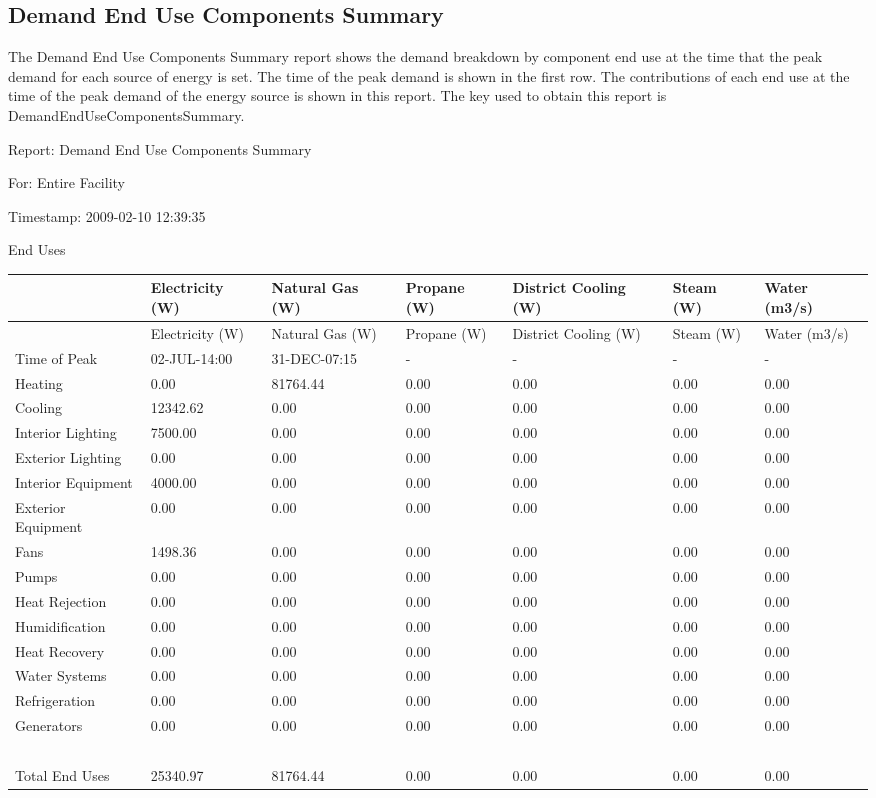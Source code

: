 \subsection{Demand End Use Components Summary}\label{demand-end-use-components-summary}

The Demand End Use Components Summary report shows the demand breakdown by component end use at the time that the peak demand for each source of energy is set. The time of the peak demand is shown in the first row. The contributions of each end use at the time of the peak demand of the energy source is shown in this report. The key used to obtain this report is DemandEndUseComponentsSummary.

Report: Demand End Use Components Summary

For: Entire Facility

Timestamp: 2009-02-10 12:39:35

End Uses

{\scriptsize
\begin{longtable}[c]{>{\raggedright}p{0.85in}>{\raggedright}p{0.85in}>{\raggedright}p{0.85in}>{\raggedright}p{0.85in}>{\raggedright}p{0.85in}>{\raggedright}p{0.85in}>{\raggedright}p{0.85in}}
\toprule
~ & Electricity (W) & Natural Gas (W) & Propane (W) & District Cooling (W) & Steam (W) & Water (m3/s) \tabularnewline
\midrule
\endfirsthead

\toprule
~ & Electricity (W) & Natural Gas (W) & Propane (W) & District Cooling (W) & Steam (W) & Water (m3/s) \tabularnewline
\midrule
\endhead

Time of Peak & 02-JUL-14:00 & 31-DEC-07:15 & - & - & - & - \tabularnewline
Heating & 0.00 & 81764.44 & 0.00 & 0.00 & 0.00 & 0.00 \tabularnewline
Cooling & 12342.62 & 0.00 & 0.00 & 0.00 & 0.00 & 0.00 \tabularnewline
Interior Lighting & 7500.00 & 0.00 & 0.00 & 0.00 & 0.00 & 0.00 \tabularnewline
Exterior Lighting & 0.00 & 0.00 & 0.00 & 0.00 & 0.00 & 0.00 \tabularnewline
Interior Equipment & 4000.00 & 0.00 & 0.00 & 0.00 & 0.00 & 0.00 \tabularnewline
Exterior Equipment & 0.00 & 0.00 & 0.00 & 0.00 & 0.00 & 0.00 \tabularnewline
Fans & 1498.36 & 0.00 & 0.00 & 0.00 & 0.00 & 0.00 \tabularnewline
Pumps & 0.00 & 0.00 & 0.00 & 0.00 & 0.00 & 0.00 \tabularnewline
Heat Rejection & 0.00 & 0.00 & 0.00 & 0.00 & 0.00 & 0.00 \tabularnewline
Humidification & 0.00 & 0.00 & 0.00 & 0.00 & 0.00 & 0.00 \tabularnewline
Heat Recovery & 0.00 & 0.00 & 0.00 & 0.00 & 0.00 & 0.00 \tabularnewline
Water Systems & 0.00 & 0.00 & 0.00 & 0.00 & 0.00 & 0.00 \tabularnewline
Refrigeration & 0.00 & 0.00 & 0.00 & 0.00 & 0.00 & 0.00 \tabularnewline
Generators & 0.00 & 0.00 & 0.00 & 0.00 & 0.00 & 0.00 \tabularnewline
~ & ~ & ~ & ~ & ~ & ~ & ~ \tabularnewline
Total End Uses & 25340.97 & 81764.44 & 0.00 & 0.00 & 0.00 & 0.00 \tabularnewline
\bottomrule
\end{longtable}}

